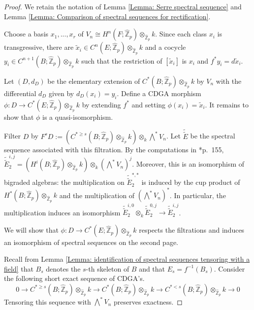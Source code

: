 \documentclass[11pt]{amsart}
\theoremstyle{definition}
\numberwithin{equation}{section}
\numberwithin{equation}{section}
\newcommand\ZZ{\mathbb{Z}}
\begin{document}
\begin{proof}
We retain the notation of Lemma \ref{Lemma: Serre spectral sequence} and Lemma \ref{Lemma: Comparison of spectral sequences for rectification}.

Choose a basis $x_1,...,x_r$ of $V_n\cong H^n(F;\widehat{\ZZ}_p)\otimes_{\widehat{\ZZ}_p} k$. Since each class $x_i$ is transgressive, there are $\widetilde{x}_i\in C^{n}(E;\widehat{\ZZ}_p)\otimes_{\widehat{\ZZ}_p} k$ and a cocycle $y_i\in C^{n+1}(B;\widehat{\ZZ}_p)\otimes_{\widehat{\ZZ}_p} k$ such that the restriction of $[\widetilde{x}_i]$ is $x_i$ and  $f^*y_i=d\widetilde{x}_i$.

Let $(D,d_D)$ be the elementary extension of $C^*(B;\widehat{\ZZ}_p)\otimes_{\widehat{\ZZ}_p} k$ by $V_n$ with the differential $d_D$ given by $d_D(x_i)=y_i$. Define a CDGA morphism $\phi:D\rightarrow C^*(E;\widehat{\ZZ}_p)\otimes_{\widehat{\ZZ}_p} k$ by extending $f^*$ and setting $\phi(x_i)=\widetilde{x}_i$. It remains to show that $\phi$ is a quasi-isomorphism.

Filter $D$ by $F^s D:=(C^{*\geq s}(B;\widehat{\ZZ}_p)\otimes_{\widehat{\ZZ}_p} k)\otimes_{k} \bigwedge^*V_n$. Let $\widetilde{\widetilde{E}}$ be the spectral sequence associated with this filtration. By the computations in \cite{MGriffiths-Morgan-rational-homotopy}*{p.~155}, $\widetilde{\widetilde{E}}^{i,j}_2=(H^i(B;\widehat{\ZZ}_p)\otimes_{\widehat{\ZZ}_p} k) \otimes_{k} (\bigwedge^*V_n)^j$. Moreover, this is an isomorphism of bigraded algebras: the multiplication on $\widetilde{\widetilde{E}}^{*,*}_2$ is induced by the cup product of $H^*(B;\widehat{\ZZ}_p)\otimes_{\widehat{\ZZ}_p} k$ and the multiplication of $(\bigwedge^*V_n)^*$. In particular, the multiplication induces an isomorphism $\widetilde{\widetilde{E}}^{i,0}_2\otimes_k \widetilde{\widetilde{E}}^{0,j}_2\rightarrow \widetilde{\widetilde{E}}^{i,j}_2$.

We will show that $\phi:D\rightarrow C^*(E;\widehat{\ZZ}_p)\otimes_{\widehat{\ZZ}_p} k$ respects the filtrations and induces an isomorphism of spectral sequences on the second page.

Recall from Lemma \ref{Lemma: identification of spectral sequences tensoring with a field} that $B_s$ denotes the $s$-th skeleton of $B$ and that $E_s=f^{-1}(B_s)$. Consider the following short exact sequence of CDGA's.
\[
0\rightarrow C^{*\geq s}(B;\widehat{\ZZ}_p)\otimes_{\widehat{\ZZ}_p} k\rightarrow C^{*}(B;\widehat{\ZZ}_p)\otimes_{\widehat{\ZZ}_p} k \rightarrow C^{*<s}(B;\widehat{\ZZ}_p)\otimes_{\widehat{\ZZ}_p} k \rightarrow 0
\]
Tensoring this sequence with $\bigwedge^* V_n$ preserves exactness.


\end{proof}
\end{document}
